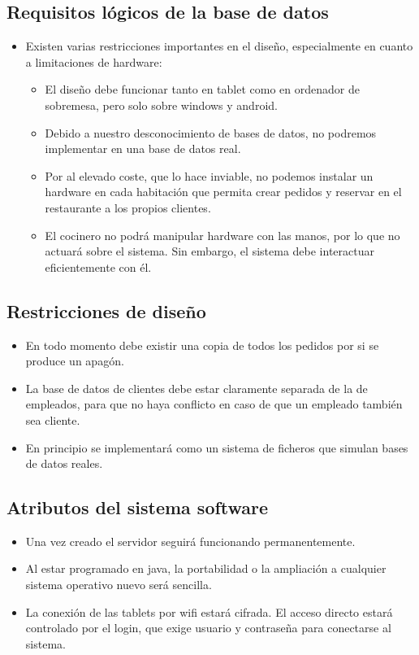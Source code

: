 \documentclass[spanish,a4paper,12pt]{report}		%
\begin{document}
\subsection{Requisitos lógicos de la base de datos}
\begin{itemize}
	\item Existen varias restricciones importantes en el diseño, especialmente en cuanto a limitaciones de hardware:
	\begin{itemize}
		\item El diseño debe funcionar tanto en tablet como en ordenador de sobremesa,  pero solo sobre windows y android.
		\item Debido a nuestro desconocimiento de bases de datos, no podremos implementar en una base de datos real.
		\item Por al elevado coste, que lo hace inviable, no podemos instalar un hardware en cada habitación que permita crear pedidos y reservar en el restaurante a los propios clientes.
		\item El cocinero no podrá manipular hardware con las manos, por lo que no actuará sobre el sistema. Sin embargo, el sistema debe interactuar eficientemente con él.
	\end{itemize}
\end{itemize}

\subsection{Restricciones de diseño}
\begin{itemize}
	\item En todo momento debe existir una copia de todos los pedidos por si se produce 	un apagón.
	\item La base de datos de clientes debe estar claramente separada de la de empleados, para que no haya conflicto en caso de que un empleado también sea cliente.
	\item En principio se implementará como un sistema de ficheros que simulan bases de datos reales.
\end{itemize}


\subsection{Atributos del sistema software}
\begin{itemize}
	\item Una vez creado el servidor seguirá funcionando permanentemente.
	\item Al estar programado en java, la portabilidad o la ampliación a cualquier sistema operativo  nuevo será sencilla. 
	\item La conexión de las tablets por wifi estará cifrada. El acceso directo estará controlado por el login, que exige usuario y contraseña para conectarse al sistema.
\end{itemize}
\end{document}
